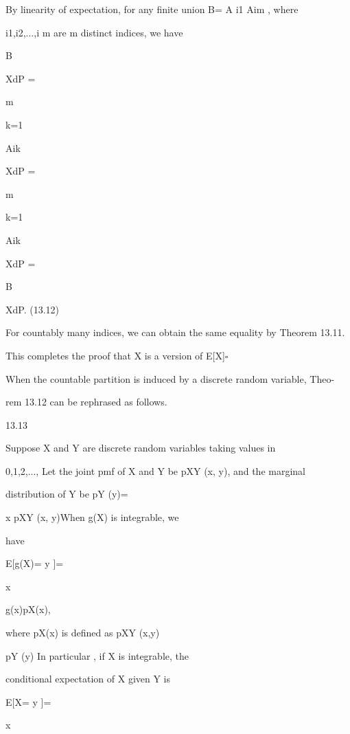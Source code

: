 By linearity of expectation, for any finite union B= A i1  \cup\cdot\cdot\cdot\cup Aim , where

i1,i2,...,i m are m distinct indices, we have

\int

B

XdP =

m\sum

k=1

\int

Aik

XdP =

m\sum

k=1

\int

Aik

XdP =

\int

B

XdP. (13.12)

For countably many indices, we can obtain the same equality by Theorem 13.11.

This completes the proof that X is a version of E[X\vert{}]\hfill $\square$

When the countable partition is induced by a discrete random variable, Theo-

rem 13.12 can be rephrased as follows.

\begin{thmbox}{13.13}
\end{thmbox}

Suppose X and Y are discrete random variables taking values in

{0,1,2,..., }Let the joint pmf of X and Y be pXY (x, y), and the marginal

distribution of Y be pY (y)= \sum

x pXY (x, y)When g(X) is integrable, we

have

E[g(X)\vertY= y ]=

\sum

x

g(x)pX\vertY (x\verty),

where pX\vertY (x\verty) is defined as pXY (x,y)

pY (y) In particular , if X is integrable, the

conditional expectation of X given Y is

E[X\vertY= y ]=

\sum

x

